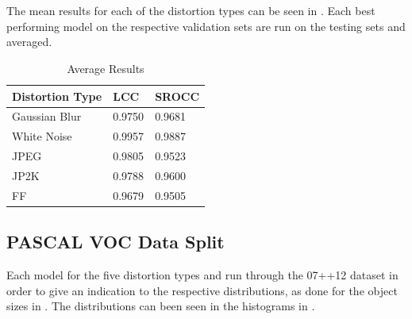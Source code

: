 \\\\
The mean results for each of the distortion types can be seen in . Each best performing model on the respective validation sets are run on the testing sets and averaged. 

\begin{table}[h]
\centering
\caption{Average Results}
\label{tab:iqaavg}
\begin{tabular}{|l|l|l|}
\hline
Distortion Type & LCC    & SROCC  \\ \hline
Gaussian Blur   & 0.9750 & 0.9681 \\ \hline
White Noise     & 0.9957 & 0.9887 \\ \hline
JPEG            & 0.9805 & 0.9523 \\ \hline
JP2K            & 0.9788 & 0.9600 \\ \hline
FF     & 0.9679 & 0.9505 \\ \hline
\end{tabular}
\end{table}


\subsection{PASCAL VOC Data Split}
Each model for the five distortion types and run through the 07++12 dataset in order to give an indication to the respective distributions, as done for the object sizes in . The distributions can been seen in the histograms in .

